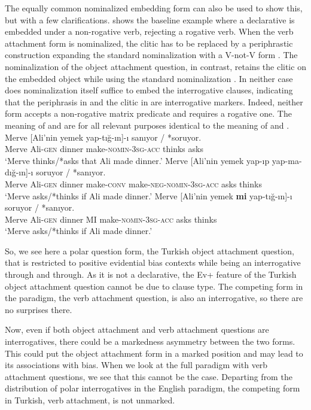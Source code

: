 \documentclass[output=paper,colorlinks,citecolor=brown]{langscibook}
\begin{document}
The equally common nominalized embedding form can also be used to show this, but with a few clarifications.  shows the baseline example where a declarative is embedded under a non-rogative verb, rejecting a rogative verb. When  the verb attachment  form is nominalized, the clitic has to be replaced by a periphrastic construction expanding the standard nominalization with a V-not-V form . The nominalization of the object attachment question, in contrast, retains the clitic on the embedded object while using the standard nominalization  \citep{kamali-diss}. In neither case does nominalization itself suffice to embed the interrogative clauses, indicating that the periphrasis in  and the clitic in  are interrogative markers. Indeed, neither form accepts a non-rogative matrix predicate and requires a rogative one. The meaning of  and  are for all relevant purposes identical to the meaning of  and .
\ea\label{ex:11:12}
\ea\label{ex:11:12a}
\gll Merve [Ali'nin            yemek {yap-tığ-ın]-ı}             sanıyor / *soruyor.\\
Merve   {\db}Ali-\textsc{gen} dinner {make-\textsc{nomin-3sg-acc}} thinks {} asks\\
\glt `Merve thinks/*asks that Ali made dinner.' 
\ex\label{ex:11:12b}
\gll Merve [Ali'nin yemek yap-ıp {yap-ma-dığ-ın]-ı} soruyor / *sanıyor.\\
Merve Ali-\textsc{gen} dinner make-\textsc{conv} {make-\textsc{neg-nomin-3sg-acc}} asks {} thinks\\
\glt `Merve asks/*thinks if Ali made dinner.' 
\ex\label{ex:11:12c}
\gll Merve [Ali'nin yemek \textbf{mi} {yap-tığ-ın]-ı} soruyor / *sanıyor.\\
Merve Ali-\textsc{gen} dinner MI {make-\textsc{nomin-3sg-acc}} asks {} thinks\\
\glt `Merve asks/*thinks if Ali made dinner.'
\z
\z

So, we see here a polar question form, the Turkish object attachment question, that is restricted to positive evidential bias contexts while being an interrogative through and through. As it is not a declarative, the Ev+ feature of the Turkish object attachment question cannot be due to clause type. The competing form in the paradigm, the verb attachment question, is also an interrogative, so there are no surprises there.

Now, even if both object attachment and verb attachment questions are interrogatives, there could be a markedness asymmetry between the two forms. This could put the object attachment form in a marked position and may lead to its associations with bias. When we look at the full paradigm with verb attachment questions, we see that this cannot be the case. Departing from the distribution of polar interrogatives in the English paradigm, the competing form in Turkish, verb attachment, is not unmarked. 
\end{document}
